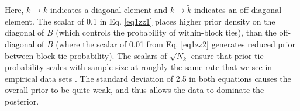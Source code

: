 \documentclass[Afour,sageh,times]{sagej}
\begin{document}
Here, $k \to k$ indicates a diagonal element and $k \to \tilde k$ indicates an off-diagonal element. 
The scalar of 0.1 in Eq. \ref{eq1zz1} places higher prior density on the diagonal of $B$ (which controls the probability of within-block ties), than the off-diagonal of $B$ (where the scalar of 0.01 from Eq. \ref{eq1zz2} generates reduced prior between-block tie probability). 
The scalars of $\sqrt{N_k}$ ensure that prior tie probability scales with sample size at roughly the same rate that we see in empirical data sets \citep{powerready2021}. 
The standard deviation of 2.5 in both equations causes the overall prior to be quite weak,  and thus allows the data to dominate the posterior. 
\end{document}
